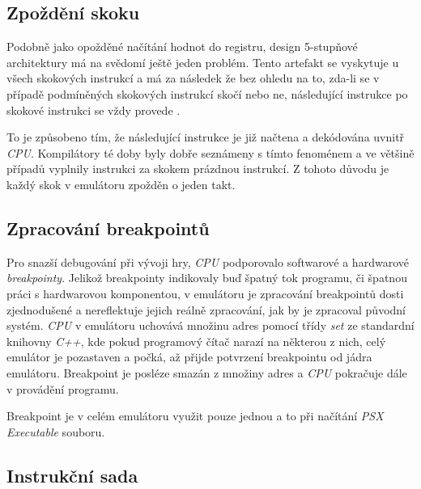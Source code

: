 \subsection{Zpoždění skoku}

Podobně jako opožděné načítání hodnot do registru, design 5-stupňové architektury má na svědomí ještě jeden problém.
Tento artefakt se vyskytuje u všech skokových instrukcí a má za následek že bez ohledu na to, zda-li se v případě 
podmíněných skokových instrukcí skočí nebo ne, následující instrukce po skokové instrukci se vždy provede \cite{MIPSSpec}.

To je způsobeno tím, že následující instrukce je již načtena a dekódována uvnitř \textit{CPU}. 
Kompilátory té doby byly dobře seznámeny s tímto fenoménem a ve většině případů vyplnily instrukci za skokem prázdnou instrukcí. 
Z tohoto důvodu je každý skok v emulátoru zpožděn o jeden takt.

\subsection{Zpracování breakpointů}

Pro snazší debugování při vývoji hry, \textit{CPU} podporovalo softwarové a hardwarové \textit{breakpointy}.
Jelikož breakpointy indikovaly buď špatný tok programu, či špatnou práci s hardwarovou komponentou,
v emulátoru je zpracování breakpointů dosti zjednodušené a nereflektuje jejich reálně zpracování, jak by je zpracoval původní systém. 
\textit{CPU} v emulátoru uchovává množinu adres pomocí třídy \textit{set} ze standardní knihovny \textit{C++}, kde pokud programový čítač narazí na některou z nich, celý emulátor je pozastaven a počká, až přijde potvrzení
breakpointu od jádra emulátoru. Breakpoint je posléze smazán z množiny adres a \textit{CPU}
pokračuje dále v provádění programu.

Breakpoint je v celém emulátoru využit pouze jednou a to při načítání \textit{PSX Executable} souboru.

\subsection{Instrukční sada}

